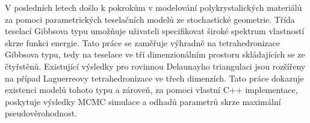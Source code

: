 \documentclass{article}
\begin{document}
V posledních letech došlo k pokrokům v modelování polykrystalických materiálů za pomoci parametrických teselačních modelů ze stochastické geometrie. Třída teselací Gibbsova typu umožňuje uživateli specifikovat široké spektrum vlastností skrze funkci energie.
Tato práce se zaměřuje výhradně na tetrahedronizace Gibbsova typu, tedy na teselace ve tří dimenzionálním prostoru skládajících se ze čtyřstěnů. Existující výsledky pro rovinnou Delaunayho triangulaci jsou rozšířeny na případ Laguerreovy tetrahedronizace ve třech dimenzích. Tato práce dokazuje existenci modelů tohoto typu a zároveň, za pomoci vlastní C++ implementace, poskytuje výsledky MCMC simulace a odhadů parametrů skrze maximální pseudověrohodnost.
\end{document}
